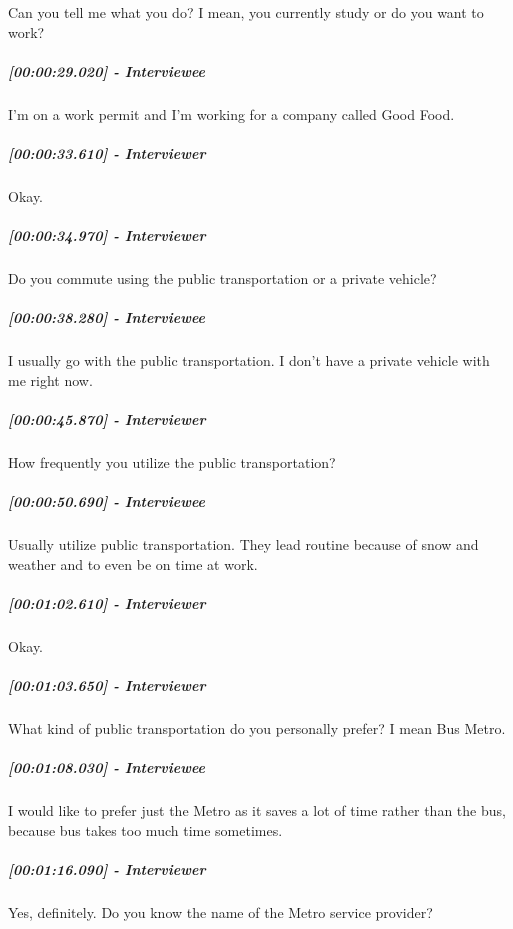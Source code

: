 \documentclass[a4paper,12pt]{article}
\begin{document}
Can you tell me what you do? I mean, you currently study or do you want
to work?

\hypertarget{interviewee-2}{%
\subparagraph{{[}00:00:29.020{]} - Interviewee}\label{interviewee-2}}

I'm on a work permit and I'm working for a company called Good Food.

\hypertarget{interviewer-3}{%
\subparagraph{{[}00:00:33.610{]} - Interviewer}\label{interviewer-3}}

Okay.

\hypertarget{interviewer-4}{%
\subparagraph{{[}00:00:34.970{]} - Interviewer}\label{interviewer-4}}

Do you commute using the public transportation or a private vehicle?

\hypertarget{interviewee-3}{%
\subparagraph{{[}00:00:38.280{]} - Interviewee}\label{interviewee-3}}

I usually go with the public transportation. I don't have a private
vehicle with me right now.

\hypertarget{interviewer-5}{%
\subparagraph{{[}00:00:45.870{]} - Interviewer}\label{interviewer-5}}

How frequently you utilize the public transportation?

\hypertarget{interviewee-4}{%
\subparagraph{{[}00:00:50.690{]} - Interviewee}\label{interviewee-4}}

Usually utilize public transportation. They lead routine because of snow
and weather and to even be on time at work.

\hypertarget{interviewer-6}{%
\subparagraph{{[}00:01:02.610{]} - Interviewer}\label{interviewer-6}}

Okay.

\hypertarget{interviewer-7}{%
\subparagraph{{[}00:01:03.650{]} - Interviewer}\label{interviewer-7}}

What kind of public transportation do you personally prefer? I mean Bus
Metro.

\hypertarget{interviewee-5}{%
\subparagraph{{[}00:01:08.030{]} - Interviewee}\label{interviewee-5}}

I would like to prefer just the Metro as it saves a lot of time rather
than the bus, because bus takes too much time sometimes.

\hypertarget{interviewer-8}{%
\subparagraph{{[}00:01:16.090{]} - Interviewer}\label{interviewer-8}}

Yes, definitely. Do you know the name of the Metro service provider?
\end{document}
